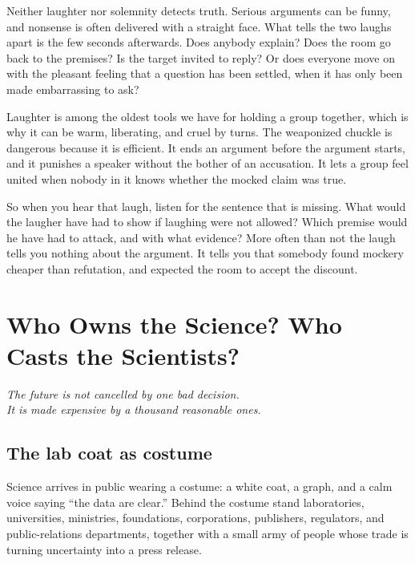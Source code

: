 \documentclass[12pt,a4paper]{book}
\begin{document}
Neither laughter nor solemnity detects truth. Serious arguments can be funny, and nonsense is often delivered with a straight face. What tells the two laughs apart is the few seconds afterwards. Does anybody explain? Does the room go back to the premises? Is the target invited to reply? Or does everyone move on with the pleasant feeling that a question has been settled, when it has only been made embarrassing to ask?

Laughter is among the oldest tools we have for holding a group together, which is why it can be warm, liberating, and cruel by turns. The weaponized chuckle is dangerous because it is efficient. It ends an argument before the argument starts, and it punishes a speaker without the bother of an accusation. It lets a group feel united when nobody in it knows whether the mocked claim was true.

So when you hear that laugh, listen for the sentence that is missing. What would the laugher have had to show if laughing were not allowed? Which premise would he have had to attack, and with what evidence? More often than not the laugh tells you nothing about the argument. It tells you that somebody found mockery cheaper than refutation, and expected the room to accept the discount.


\chapter{Who Owns the Science? Who Casts the Scientists?}
\label{chap:who-owns-the-science}

\begin{flushright}
\emph{The future is not cancelled by one bad decision.\\
It is made expensive by a thousand reasonable ones.}
\end{flushright}

\section{The lab coat as costume}

Science arrives in public wearing a costume: a white coat, a graph, and a calm voice saying ``the data are clear.'' Behind the costume stand laboratories, universities, ministries, foundations, corporations, publishers, regulators, and public-relations departments, together with a small army of people whose trade is turning uncertainty into a press release.
\end{document}
